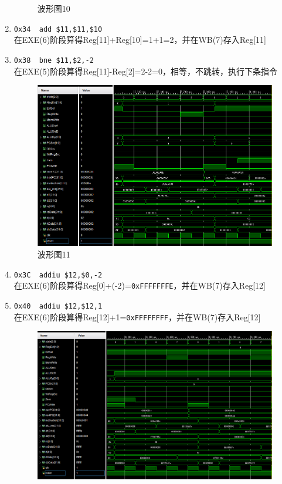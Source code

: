 \begin{enumerate}
\begin{figure}[H]
\caption{波形图10}
\label{fig:wave_10}
\end{figure}
    \item \verb'0x34  add $11,$11,$10'\\
    在EXE(6)阶段算得Reg[11]+Reg[10]=1+1=2，并在WB(7)存入Reg[11]
    \item \verb'0x38  bne $11,$2,-2'\\
    在EXE(5)阶段算得Reg[11]-Reg[2]=2-2=0，相等，不跳转，执行下条指令
\begin{figure}[H]
\centering
\includegraphics[width=0.9\linewidth]{fig/FullIns/Ins11.PNG}
\caption{波形图11}
\label{fig:wave_11}
\end{figure}
    \item \verb'0x3C  addiu $12,$0,-2'\\
    在EXE(6)阶段算得Reg[0]+(-2)=\verb'0xFFFFFFFE'，并在WB(7)存入Reg[12]
    \item \verb'0x40  addiu $12,$12,1'\\
    在EXE(6)阶段算得Reg[12]+1=\verb'0xFFFFFFFF'，并在WB(7)存入Reg[12]
\begin{figure}[H]
\centering
\includegraphics[width=0.9\linewidth]{fig/FullIns/Ins12.PNG}

\end{figure}
\end{enumerate}
